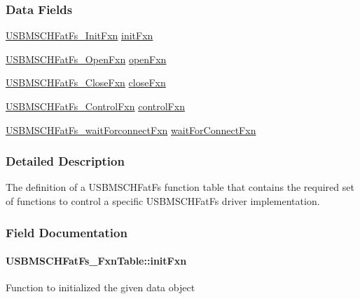 \subsubsection*{Data Fields}
\begin{DoxyCompactItemize}
\item 
\hyperlink{_u_s_b_m_s_c_h_fat_fs_8h_a2909390706605acd0972b1d77aa449e5}{U\+S\+B\+M\+S\+C\+H\+Fat\+Fs\+\_\+\+Init\+Fxn} \hyperlink{struct_u_s_b_m_s_c_h_fat_fs___fxn_table_aed81cb3f4712fede69b37c5c9f2b4bf0}{init\+Fxn}
\item 
\hyperlink{_u_s_b_m_s_c_h_fat_fs_8h_ae4916284bc1646118c40574df42a4bc8}{U\+S\+B\+M\+S\+C\+H\+Fat\+Fs\+\_\+\+Open\+Fxn} \hyperlink{struct_u_s_b_m_s_c_h_fat_fs___fxn_table_a13c7789ab06803a31da9e1afcc417c6d}{open\+Fxn}
\item 
\hyperlink{_u_s_b_m_s_c_h_fat_fs_8h_a599ab79cca3d2ca8f00c72574baf6694}{U\+S\+B\+M\+S\+C\+H\+Fat\+Fs\+\_\+\+Close\+Fxn} \hyperlink{struct_u_s_b_m_s_c_h_fat_fs___fxn_table_a4bba40c1865c2c6237159fe7b6a032e4}{close\+Fxn}
\item 
\hyperlink{_u_s_b_m_s_c_h_fat_fs_8h_aee939ae4a7a17ef93e777a855bc70dcc}{U\+S\+B\+M\+S\+C\+H\+Fat\+Fs\+\_\+\+Control\+Fxn} \hyperlink{struct_u_s_b_m_s_c_h_fat_fs___fxn_table_adaf8b8740fb175c2abfcf60b014329e3}{control\+Fxn}
\item 
\hyperlink{_u_s_b_m_s_c_h_fat_fs_8h_a0c9baca220e5c94c5b5e27cb8963e6f8}{U\+S\+B\+M\+S\+C\+H\+Fat\+Fs\+\_\+wait\+Forconnect\+Fxn} \hyperlink{struct_u_s_b_m_s_c_h_fat_fs___fxn_table_a999480d893f4420add53342adfa3c71f}{wait\+For\+Connect\+Fxn}
\end{DoxyCompactItemize}


\subsubsection{Detailed Description}
The definition of a U\+S\+B\+M\+S\+C\+H\+Fat\+Fs function table that contains the required set of functions to control a specific U\+S\+B\+M\+S\+C\+H\+Fat\+Fs driver implementation. 

\subsubsection{Field Documentation}
\paragraph[{init\+Fxn}]{ U\+S\+B\+M\+S\+C\+H\+Fat\+Fs\+\_\+\+Fxn\+Table\+::init\+Fxn}\label{struct_u_s_b_m_s_c_h_fat_fs___fxn_table_aed81cb3f4712fede69b37c5c9f2b4bf0}
Function to initialized the given data object 
